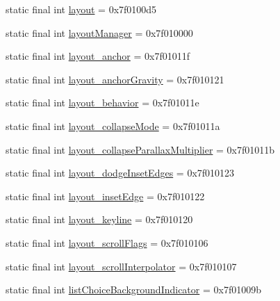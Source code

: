 \begin{CompactItemize}
\item 
static final int \hyperlink{classandroid_1_1support_1_1graphics_1_1drawable_1_1_r_1_1attr_4584f08f639ce13597df1046bed4677e}{layout} = 0x7f0100d5
\item 
static final int \hyperlink{classandroid_1_1support_1_1graphics_1_1drawable_1_1_r_1_1attr_d470a1248816764b35b5536697cdc47c}{layoutManager} = 0x7f010000
\item 
static final int \hyperlink{classandroid_1_1support_1_1graphics_1_1drawable_1_1_r_1_1attr_80dbbfc9892175459cc20ac9f3128bea}{layout\_\-anchor} = 0x7f01011f
\item 
static final int \hyperlink{classandroid_1_1support_1_1graphics_1_1drawable_1_1_r_1_1attr_23768eee7b5011964e9f5b831d068d8a}{layout\_\-anchorGravity} = 0x7f010121
\item 
static final int \hyperlink{classandroid_1_1support_1_1graphics_1_1drawable_1_1_r_1_1attr_c970f74dedb25ca43d57e1eb7255f779}{layout\_\-behavior} = 0x7f01011e
\item 
static final int \hyperlink{classandroid_1_1support_1_1graphics_1_1drawable_1_1_r_1_1attr_440ca68361d164aa080a25fe150dac47}{layout\_\-collapseMode} = 0x7f01011a
\item 
static final int \hyperlink{classandroid_1_1support_1_1graphics_1_1drawable_1_1_r_1_1attr_e5cb01a1b1bad1d711e296923d730c25}{layout\_\-collapseParallaxMultiplier} = 0x7f01011b
\item 
static final int \hyperlink{classandroid_1_1support_1_1graphics_1_1drawable_1_1_r_1_1attr_485f9c004e688db1b91f39c1aa1bb0e5}{layout\_\-dodgeInsetEdges} = 0x7f010123
\item 
static final int \hyperlink{classandroid_1_1support_1_1graphics_1_1drawable_1_1_r_1_1attr_ca729f0e3b4a28d3495432b0469e6cd7}{layout\_\-insetEdge} = 0x7f010122
\item 
static final int \hyperlink{classandroid_1_1support_1_1graphics_1_1drawable_1_1_r_1_1attr_d23e2bc2a00fccadc5e9c92cb0c6a890}{layout\_\-keyline} = 0x7f010120
\item 
static final int \hyperlink{classandroid_1_1support_1_1graphics_1_1drawable_1_1_r_1_1attr_3522b591271a932a0b78da425c68313e}{layout\_\-scrollFlags} = 0x7f010106
\item 
static final int \hyperlink{classandroid_1_1support_1_1graphics_1_1drawable_1_1_r_1_1attr_243e1c52abac057244fc6803414e9c14}{layout\_\-scrollInterpolator} = 0x7f010107
\item 
static final int \hyperlink{classandroid_1_1support_1_1graphics_1_1drawable_1_1_r_1_1attr_7f633c311f4345782f99978dedf3fc80}{listChoiceBackgroundIndicator} = 0x7f01009b

\end{CompactItemize}
